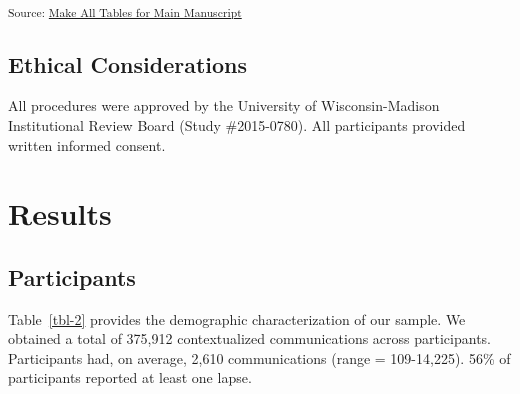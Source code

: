 \documentclass[
  letterpaper,
  DIV=11,
  numbers=noendperiod]{scrartcl}
\begin{document}
\textsubscript{Source:
\href{https://jjcurtin.github.io/study_messages/notebooks/mak_tables-preview.html\#cell-tbl-1}{Make
All Tables for Main Manuscript}}

\subsection{Ethical Considerations}\label{ethical-considerations}

All procedures were approved by the University of Wisconsin-Madison
Institutional Review Board (Study \#2015-0780). All participants
provided written informed consent.

\section{Results}\label{results}

\subsection{Participants}\label{participants}

Table~\ref{tbl-2} provides the demographic characterization of our
sample. We obtained a total of 375,912 contextualized communications
across participants. Participants had, on average, 2,610 communications
(range = 109-14,225). 56\% of participants reported at least one lapse.
\end{document}
